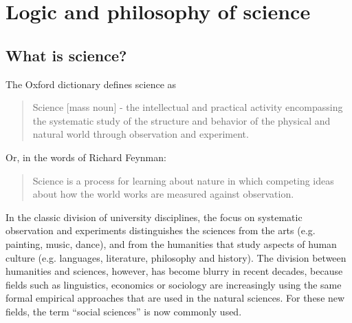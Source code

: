 \documentclass{tufte-book}
\begin{document}
\chapter{Logic and philosophy of science}

\section{What is science?}

The Oxford dictionary defines science as 

\begin{quote}
Science [mass noun] - the intellectual and practical activity encompassing the systematic study of the structure and behavior of the physical and natural world through observation and experiment.
\end{quote}

\noindent Or, in the words of Richard Feynman:

\begin{quote}
Science is a process for learning about nature in which competing ideas about how the world works are measured against observation.
\end{quote}

In the classic division of university disciplines, the focus on systematic observation and experiments distinguishes the sciences from the arts (e.g. painting, music, dance), and from the humanities that study aspects of human culture (e.g. languages, literature, philosophy and history). The division between humanities and sciences, however, has become blurry in recent decades, because fields such as linguistics, economics or sociology are increasingly using the same formal empirical approaches that are used in the natural sciences. For these new fields, the term ``social sciences'' is now commonly used. 
\end{document}
